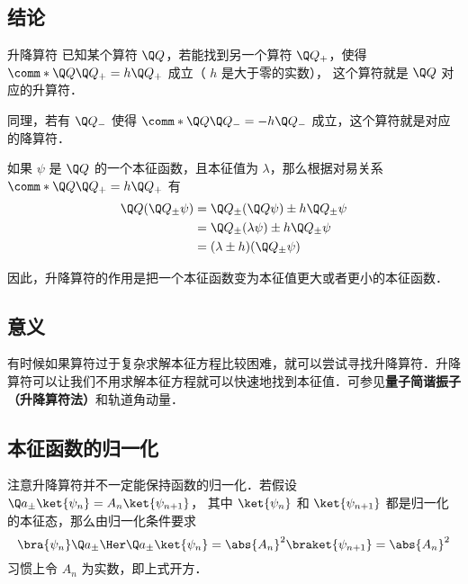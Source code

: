 
\begin{issues}
\issueDraft
\end{issues}



\subsection{结论}

\begin{definition}{升降算符}
已知某个算符 $\Q Q$，若能找到另一个算符 $\Q Q_+$，使得 $\comm*{\Q Q}{\Q Q_+} = h \Q Q_+$ 成立（ $h$ 是大于零的实数）， 这个算符就是 $\Q Q$ 对应的升算符． 

同理，若有 $\Q Q_-$ 使得 $\comm*{\Q Q}{\Q Q_-} = - h\Q Q_-$ 成立，这个算符就是对应的降算符．
\end{definition}

如果 $\psi$ 是 $\Q Q$ 的一个本征函数，且本征值为 $\lambda$，那么根据对易关系 $\comm*{\Q Q}{\Q Q_+} = h \Q Q_+$ 有
\begin{equation}
\begin{aligned}
\Q Q (\Q Q_\pm \psi) &= \Q Q_\pm (\Q Q\psi) \pm h \Q Q_\pm \psi  \\
&= \Q Q_\pm (\lambda \psi) \pm h \Q Q_\pm \psi  \\
&= (\lambda  \pm h)(\Q Q_\pm \psi)
\end{aligned}
\end{equation}

因此，升降算符的作用是把一个本征函数变为本征值更大或者更小的本征函数．





\subsection{意义}
有时候如果算符过于复杂求解本征方程比较困难，就可以尝试寻找升降算符．升降算符可以让我们不用求解本征方程就可以快速地找到本征值．可参见\textbf{量子简谐振子（升降算符法）}和轨道角动量．%


\subsection{本征函数的归一化}
注意升降算符并不一定能保持函数的归一化．若假设 $\Q a_\pm \ket{\psi_n} = A_n \ket{\psi_{n+1}}$， 其中 $\ket{\psi_n}$ 和 $\ket{\psi_{n + 1}}$ 都是归一化的本征态，那么由归一化条件要求
\begin{equation}
\bra{\psi_n} \Q a_\pm\Her \Q a_\pm \ket{\psi_n} = \abs{A_n}^2 \braket{\psi_{n+1}} = \abs{A_n}^2
\end{equation}
习惯上令 $A_n$ 为实数，即上式开方． 

